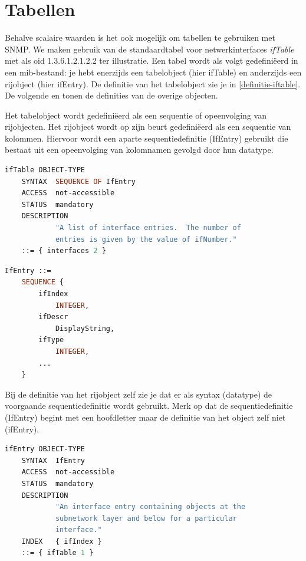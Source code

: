 \section{Tabellen}

Behalve scalaire waarden is het ook mogelijk om tabellen te gebruiken met SNMP.
We maken gebruik van de standaardtabel voor netwerkinterfaces \emph{ifTable} met als \gls{oid} 1.3.6.1.2.1.2.2 ter illustratie.
Een tabel wordt als volgt gedefiniëerd in een \gls{mib}-bestand: 
je hebt enerzijds een tabelobject (hier ifTable) en anderzijds een rijobject (hier ifEntry).
De definitie van het tabelobject zie je in \lstlistingnamesentence{} \ref{definitie-iftable}.
De volgende \lstlistingnamesentence{}en tonen de definities van de overige objecten.

Het tabelobject wordt gedefiniëerd als een sequentie of opeenvolging van rijobjecten.
Het rijobject wordt op zijn beurt gedefiniëerd als een sequentie van kolommen.
Hiervoor wordt een aparte sequentiedefinitie (IfEntry) gebruikt die 
bestaat uit een opeenvolging van kolomnamen gevolgd door hun datatype.

\begin{lstlisting}[language=asn.1, float=h, caption={Definitie van ifTable}, label=definitie-iftable]
ifTable OBJECT-TYPE
	SYNTAX	SEQUENCE OF IfEntry
	ACCESS	not-accessible
	STATUS	mandatory
	DESCRIPTION
			"A list of interface entries.  The number of
			entries is given by the value of ifNumber."
	::= { interfaces 2 }
\end{lstlisting}

\begin{lstlisting}[language=asn.1, float=h, caption={Sequentiedefinitie voor een tabelrij}, label=definitie-sequentie-rij]
IfEntry ::=
	SEQUENCE {
		ifIndex
			INTEGER,
		ifDescr
			DisplayString,
		ifType
			INTEGER,
		...
	}
\end{lstlisting}

Bij de definitie van het rijobject zelf zie je dat er als syntax (datatype) de voorgaande sequentiedefinitie wordt gebruikt.
Merk op dat de sequentiedefinitie (IfEntry) begint met een hoofdletter maar de definitie van het object zelf niet (ifEntry).

\begin{lstlisting}[language=asn.1, float=h, caption={Definitie van een rijobject}, label=definitie-rijobject]
ifEntry OBJECT-TYPE
	SYNTAX	IfEntry
	ACCESS	not-accessible
	STATUS	mandatory
	DESCRIPTION
			"An interface entry containing objects at the
			subnetwork layer and below for a particular
			interface."
	INDEX	{ ifIndex }
	::= { ifTable 1 }
\end{lstlisting}

